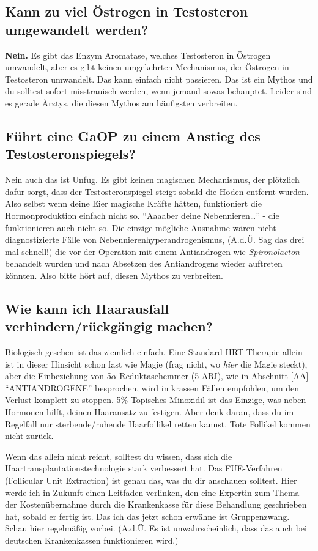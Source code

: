 \documentclass{article}
\begin{document}
\subsection{Kann zu viel Östrogen in Testosteron umgewandelt werden?}

\textbf{Nein.} Es gibt das Enzym Aromatase, welches Testosteron in Östrogen umwandelt, aber es gibt keinen umgekehrten Mechanismus, der Östrogen in Testosteron umwandelt. Das kann einfach nicht passieren. Das ist ein  Mythos und du solltest sofort misstrauisch werden, wenn jemand sowas behauptet. Leider sind es gerade Ärztys, die diesen Mythos am häufigsten verbreiten.

\subsection{Führt eine GaOP zu einem Anstieg des Testosteronspiegels?}

Nein auch das ist Unfug. Es gibt keinen magischen Mechanismus, der plötzlich dafür sorgt, dass der Testosteronspiegel steigt sobald die Hoden entfernt wurden. Also selbst wenn deine Eier magische Kräfte hätten, funktioniert die Hormonproduktion einfach nicht so. “Aaaaber deine Nebennieren…” - die funktionieren auch nicht so. Die einzige mögliche Ausnahme wären nicht diagnostizierte Fälle von Nebennierenhyperandrogenismus, (A.d.Ü. Sag das drei mal schnell!) die vor der Operation mit einem Antiandrogen wie \textit{Spironolacton} behandelt wurden und nach Absetzen des Antiandrogens wieder auftreten könnten. Also bitte hört auf, diesen Mythos zu verbreiten.

\subsection{Wie kann ich Haarausfall verhindern/rückgängig machen?}\label{11-14}

Biologisch gesehen ist das ziemlich einfach. Eine Standard-HRT-Therapie allein ist in dieser Hinsicht schon fast wie Magie (frag nicht, wo \textit{hier} die Magie steckt), aber die Einbeziehung von 5$\alpha$-Reduktasehemmer (5-ARI), wie in Abschnitt \ref{AA} “ANTIANDROGENE” besprochen, wird in krassen Fällen empfohlen, um den Verlust komplett zu stoppen. 5\% Topisches Minoxidil ist das Einzige, was neben Hormonen hilft, deinen Haaransatz zu festigen. Aber denk daran, dass du im Regelfall nur sterbende/ruhende Haarfollikel retten kannst. Tote Follikel kommen nicht zurück.

Wenn das allein nicht reicht, solltest du wissen, dass sich die Haartransplantationstechnologie stark verbessert hat. Das FUE-Verfahren (Follicular Unit Extraction) ist genau das, was du dir anschauen solltest. Hier werde ich in Zukunft einen Leitfaden verlinken, den eine Expertin zum Thema der Kostenübernahme durch die Krankenkasse für diese Behandlung geschrieben hat, sobald er fertig ist. Das ich das jetzt schon erwähne ist Gruppenzwang. Schau hier regelmäßig vorbei. (A.d.Ü. Es ist unwahrscheinlich, dass das auch bei deutschen Krankenkassen funktionieren wird.)
\end{document}
